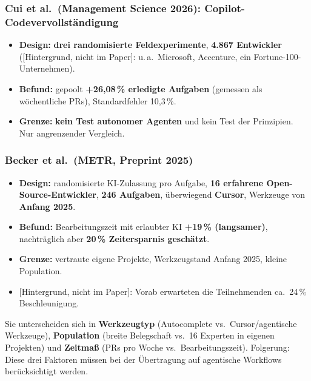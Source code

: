 \documentclass[12pt,a4paper]{article}
\newcommand{\hg}{\textcolor{grau}{\small[Hintergrund, nicht im Paper]}}
\begin{document}
\subsubsection*{Cui et al.\ (Management Science 2026): Copilot-Codevervollständigung}
\begin{itemize}
  \item \textbf{Design:} \textbf{drei randomisierte Feldexperimente}, \textbf{4.867 Entwickler} (\hg: u.\,a.\ Microsoft, Accenture, ein Fortune-100-Unternehmen).
  \item \textbf{Befund:} gepoolt \textbf{+26,08\,\% erledigte Aufgaben} (gemessen als wöchentliche PRs), Standardfehler 10,3\,\%.
  \item \textbf{Grenze:} \textbf{kein Test autonomer Agenten} und kein Test der Prinzipien. Nur angrenzender Vergleich.
\end{itemize}

\subsubsection*{Becker et al.\ (METR, Preprint 2025)}
\begin{itemize}
  \item \textbf{Design:} randomisierte KI-Zulassung pro Aufgabe, \textbf{16 erfahrene Open-Source-Entwickler}, \textbf{246 Aufgaben}, überwiegend \textbf{Cursor}, Werkzeuge von \textbf{Anfang 2025}.
  \item \textbf{Befund:} Bearbeitungszeit mit erlaubter KI \textbf{+19\,\% (langsamer)}, nachträglich aber \textbf{20\,\% Zeitersparnis geschätzt}.
  \item \textbf{Grenze:} vertraute eigene Projekte, Werkzeugstand Anfang 2025, kleine Population.
  \item \hg: Vorab erwarteten die Teilnehmenden ca.\ 24\,\% Beschleunigung.
\end{itemize}

\begin{merke}
Sie unterscheiden sich in \textbf{Werkzeugtyp} (Autocomplete vs.\ Cursor/agentische Werkzeuge), \textbf{Population} (breite Belegschaft vs.\ 16 Experten in eigenen Projekten) und \textbf{Zeitmaß} (PRs pro Woche vs.\ Bearbeitungszeit). Folgerung: Diese drei Faktoren müssen bei der Übertragung auf agentische Workflows berücksichtigt werden.
\end{merke}
\end{document}
